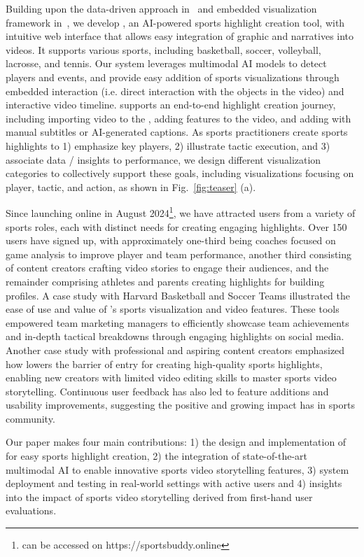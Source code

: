 Building upon the data-driven approach in~\cite{chen2021augmenting} and embedded visualization framework in~\cite{lin2022quest}, we develop \SB{}, an AI-powered sports highlight creation tool, with intuitive web interface that allows easy integration of graphic and narratives into videos. It supports various sports, including basketball, soccer, volleyball, lacrosse, and tennis.
Our system leverages multimodal AI models to detect players and events, and provide easy addition of sports visualizations through embedded interaction (i.e. direct interaction with the objects in the video) and interactive video timeline. 
\SB{} supports an end-to-end highlight creation journey, 
including importing video to the \Media{}, adding \Highlight{} features to the video, and adding \Narrative{} with manual subtitles or AI-generated captions.
% 
As sports practitioners create sports highlights to 1) emphasize key players,
2) illustrate tactic execution,
and 3) associate data / insights to performance, we design different visualization categories to collectively support these goals, including visualizations focusing on player, tactic, and action, as shown in Fig.~\ref{fig:teaser} (a).

Since launching \SB{} online in August 2024\footnote[1]{\SB{} can be accessed on https://sportsbuddy.online}, 
we have attracted users from a variety of sports roles, each with distinct needs for creating engaging highlights. Over 150 users have signed up, with approximately one-third being coaches focused on game analysis to improve player and team performance, another third consisting of content creators crafting video stories to engage their audiences, and the remainder comprising athletes and parents creating highlights for building profiles.
A case study with Harvard Basketball and Soccer Teams illustrated the ease of use and value of \SB{}'s sports visualization and video features. These tools empowered team marketing managers to efficiently showcase team achievements and in-depth tactical breakdowns through engaging highlights on social media. Another case study with professional and aspiring content creators emphasized how \SB{} lowers the barrier of entry for creating high-quality sports highlights, enabling new creators with limited video editing skills to master sports video storytelling.  
Continuous user feedback has also led to feature additions and usability improvements, suggesting the positive and growing impact \SB{} has in sports community.

Our paper makes four main contributions: 1) the design and implementation of \SB{} for easy sports highlight creation, 2) the integration of state-of-the-art multimodal AI to enable innovative sports video storytelling features, 3) system deployment and testing in real-world settings with active users and 4) insights into the impact of sports video storytelling derived from first-hand user evaluations. 





